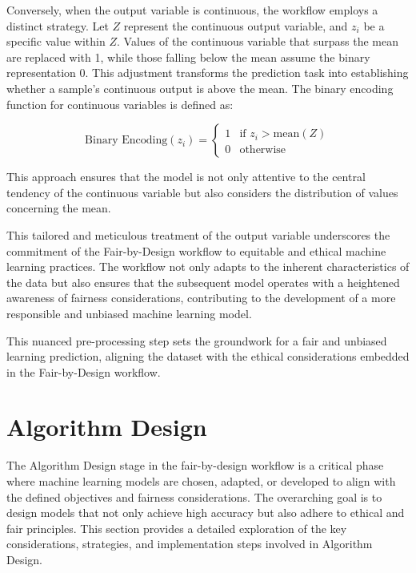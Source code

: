 \documentclass[12pt,a4paper,openright,twoside]{book}
\begin{document}
\begin{enumerate}
    Conversely, when the output variable is continuous, the workflow employs a distinct strategy. Let $Z$ represent the continuous output variable, and $z_i$ be a specific value within $Z$. Values of the continuous variable that surpass the mean are replaced with 1, while those falling below the mean assume the binary representation 0. This adjustment transforms the prediction task into establishing whether a sample's continuous output is above the mean. The binary encoding function for continuous variables is defined as:

    \[
    \text{Binary Encoding}(z_i) = \begin{cases} 
    1 & \text{if } z_i > \text{mean}(Z) \\ 
    0 & \text{otherwise}
    \end{cases}
    \]

    This approach ensures that the model is not only attentive to the central tendency of the continuous variable but also considers the distribution of values concerning the mean.

    This tailored and meticulous treatment of the output variable underscores the commitment of the Fair-by-Design workflow to equitable and ethical machine learning practices. The workflow not only adapts to the inherent characteristics of the data but also ensures that the subsequent model operates with a heightened awareness of fairness considerations, contributing to the development of a more responsible and unbiased machine learning model.

\end{enumerate}

This nuanced pre-processing step sets the groundwork for a fair and unbiased learning prediction, aligning the dataset with the ethical considerations embedded in the Fair-by-Design workflow.

\section{Algorithm Design}
\label{section: algorithm-design}

The Algorithm Design stage in the fair-by-design workflow is a critical phase where machine learning models are chosen, adapted, or developed to align with the defined objectives and fairness considerations. The overarching goal is to design models that not only achieve high accuracy but also adhere to ethical and fair principles. This section provides a detailed exploration of the key considerations, strategies, and implementation steps involved in Algorithm Design.
\end{document}
